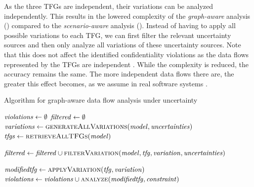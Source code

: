 As the three \acp{TFG} are independent, their variations can be analyzed independently.
This results in the lowered complexity of the \emph{graph-aware} analysis () compared to the \emph{scenario-aware} analysis ().
Instead of having to apply all possible variations to each \ac{TFG}, we can first filter the relevant uncertainty sources and then only analyze all variations of these uncertainty sources.
Note that this does not affect the identified confidentiality violations as the data flows represented by the \acp{TFG} are independent \cite{seifermann_architectural_2022}.
While the complexity is reduced, the accuracy remains the same.
The more independent data flows there are, the greater this effect becomes, as we assume in real software systems \cite{hahner_architecture-based_2023}.

\begin{algorithm}
    \caption{Algorithm for graph-aware data flow analysis under uncertainty}
    \label{alg:confidentialityanalysis:graphaware}
    \begin{algorithmic}[1]
            \algindentskip
            \State $\mathit{violations} \gets \emptyset$
            \State $\mathit{filtered} \gets \emptyset$
            \State $\mathit{variations} \gets \textsc{generateAllVariations}(\mathit{model}, \mathit{uncertainties})$
            \State $\mathit{tfgs} \gets \textsc{retrieveAllTFGs}(\mathit{model})$
            \algblockskip

              \label{alg:confidentialityanalysis:graphaware:6}
                 
                    \State $\mathit{filtered} \gets \mathit{filtered} \cup \textsc{filterVariation}(\mathit{model}, \mathit{tfg}, \mathit{variation}, \mathit{uncertainties})$\label{alg:confidentialityanalysis:graphaware:8}
                \EndFor
                \algblockskip

                 
                    \State $\mathit{modifiedtfg} \gets \textsc{applyVariation}(\mathit{tfg}, \mathit{variation})$ \label{alg:confidentialityanalysis:graphaware:11}
                    \State $\mathit{violations} \gets \mathit{violations} \cup \textsc{analyze}(\mathit{modifiedtfg}, \mathit{constraint})$ 
                \EndFor
            \EndFor
            \algblockskip

            \State {}
            \algindentskip
        \EndProcedure   
    \end{algorithmic}
\end{algorithm}

